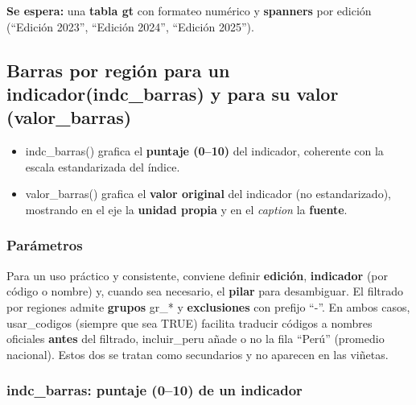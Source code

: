 \documentclass[
  11pt,
  letterpaper,
  DIV=11,
  numbers=noendperiod]{scrartcl}
\begin{document}
\textbf{Se espera:} una \textbf{tabla gt} con formateo numérico y
\textbf{spanners} por edición (``Edición 2023'', ``Edición 2024'',
``Edición 2025'').

\subsection{\texorpdfstring{\textbf{Barras por región para un
indicador(indc\_barras) y para su valor
(valor\_barras)}}{Barras por región para un indicador(indc\_barras) y para su valor (valor\_barras)}}\label{barras-por-regiuxf3n-para-un-indicadorindc_barras-y-para-su-valor-valor_barras}

\begin{itemize}
\item
  indc\_barras() grafica el \textbf{puntaje (0--10)} del indicador,
  coherente con la escala estandarizada del índice.
\item
  valor\_barras() grafica el \textbf{valor original} del indicador (no
  estandarizado), mostrando en el eje la \textbf{unidad propia} y en el
  \emph{caption} la \textbf{fuente}.
\end{itemize}

\subsubsection{\texorpdfstring{\textbf{Parámetros}}{Parámetros}}\label{paruxe1metros-9}

Para un uso práctico y consistente, conviene definir \textbf{edición},
\textbf{indicador} (por código o nombre) y, cuando sea necesario, el
\textbf{pilar} para desambiguar. El filtrado por regiones admite
\textbf{grupos} gr\_* y \textbf{exclusiones} con prefijo ``-''. En ambos
casos, usar\_codigos (siempre que sea TRUE) facilita traducir códigos a
nombres oficiales \textbf{antes} del filtrado, incluir\_peru añade o no
la fila ``Perú'' (promedio nacional). Estos dos se tratan como
secundarios y no aparecen en las viñetas.

\subsubsection{\texorpdfstring{\textbf{indc\_barras: puntaje (0--10) de
un
indicador}}{indc\_barras: puntaje (0--10) de un indicador}}\label{indc_barras-puntaje-010-de-un-indicador}
\end{document}
